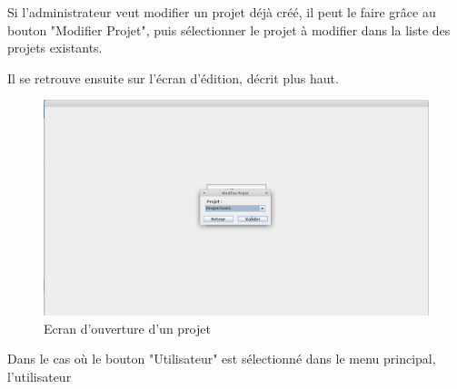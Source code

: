 \documentclass[12pt]{report}
\begin{document}
Si l'administrateur veut modifier un projet déjà créé, il peut le faire grâce au bouton "Modifier Projet", puis sélectionner le projet à modifier dans la liste des projets existants.

Il se retrouve ensuite sur l'écran d'édition, décrit plus haut.


\begin{figure}
\centering
\includegraphics[scale=0.3]{IHM/selection_modifier_projet.png}
\caption{Ecran d'ouverture d'un projet}
\end{figure}

Dans le cas où le bouton "Utilisateur" est sélectionné dans le menu principal, l'utilisateur
\end{document}
